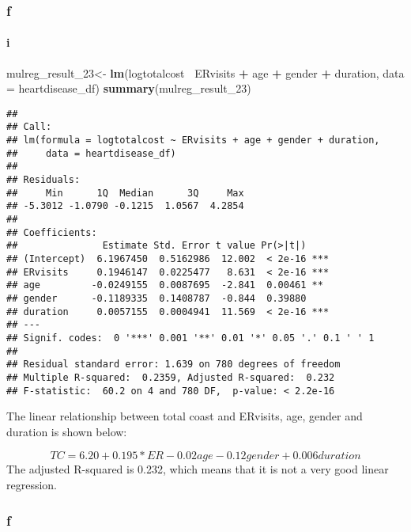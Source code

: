 \documentclass[]{article}
\newenvironment{Shaded}{\begin{snugshade}}{\end{snugshade}}
\newcommand{\KeywordTok}[1]{\textcolor[rgb]{0.13,0.29,0.53}{\textbf{#1}}}
\newcommand{\DataTypeTok}[1]{\textcolor[rgb]{0.13,0.29,0.53}{#1}}
\newcommand{\DecValTok}[1]{\textcolor[rgb]{0.00,0.00,0.81}{#1}}
\newcommand{\StringTok}[1]{\textcolor[rgb]{0.31,0.60,0.02}{#1}}
\newcommand{\OperatorTok}[1]{\textcolor[rgb]{0.81,0.36,0.00}{\textbf{#1}}}
\newcommand{\NormalTok}[1]{#1}
\let\oldparagraph\paragraph
\renewcommand{\paragraph}[1]{\oldparagraph{#1}\mbox{}}
\begin{document}
\subsubsection{f}\label{f}

\paragraph{i}\label{i-1}

\begin{Shaded}
\begin{Highlighting}[]
\NormalTok{mulreg_result_}\DecValTok{23}\NormalTok{<-}\StringTok{ }\KeywordTok{lm}\NormalTok{(logtotalcost}\OperatorTok{~}\StringTok{ }\NormalTok{ERvisits }\OperatorTok{+}\StringTok{ }\NormalTok{age }\OperatorTok{+}\StringTok{ }\NormalTok{gender }\OperatorTok{+}\StringTok{ }\NormalTok{duration, }\DataTypeTok{data =}\NormalTok{ heartdisease_df)}
\KeywordTok{summary}\NormalTok{(mulreg_result_}\DecValTok{23}\NormalTok{) }
\end{Highlighting}
\end{Shaded}

\begin{verbatim}
## 
## Call:
## lm(formula = logtotalcost ~ ERvisits + age + gender + duration, 
##     data = heartdisease_df)
## 
## Residuals:
##     Min      1Q  Median      3Q     Max 
## -5.3012 -1.0790 -0.1215  1.0567  4.2854 
## 
## Coefficients:
##               Estimate Std. Error t value Pr(>|t|)    
## (Intercept)  6.1967450  0.5162986  12.002  < 2e-16 ***
## ERvisits     0.1946147  0.0225477   8.631  < 2e-16 ***
## age         -0.0249155  0.0087695  -2.841  0.00461 ** 
## gender      -0.1189335  0.1408787  -0.844  0.39880    
## duration     0.0057155  0.0004941  11.569  < 2e-16 ***
## ---
## Signif. codes:  0 '***' 0.001 '**' 0.01 '*' 0.05 '.' 0.1 ' ' 1
## 
## Residual standard error: 1.639 on 780 degrees of freedom
## Multiple R-squared:  0.2359, Adjusted R-squared:  0.232 
## F-statistic:  60.2 on 4 and 780 DF,  p-value: < 2.2e-16
\end{verbatim}

The linear relationship between total coast and ERvisits, age, gender
and duration is shown below:

\[
TC = 6.20 + 0.195*ER - 0.02age - 0.12gender + 0.006 duration
\] The adjusted R-squared is 0.232, which means that it is not a very
good linear regression.

\subsubsection{f}\label{f-1}
\end{document}
